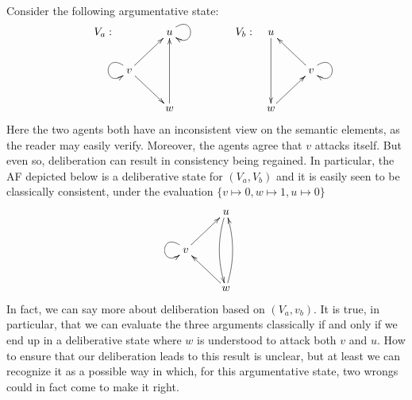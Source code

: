 \documentclass[greybox]{svmult}
\begin{document}
\begin{example}
\end{example}

\begin{example}\label{ex:wr}
Consider the following argumentative state:
$$
\begin{array}{llll}
V_a: & \xymatrix{ & u \ar@(ru,rd) \\ v \ar[ur] \ar[dr] \ar@(lu,ld) \\ & w \ar[uu] } & \hspace{1.5cm} V_b: & \xymatrix{ u \ar[dd] \\ & v \ar@(ru,rd) \ar[ul] \\ w \ar[ur] }
\end{array}
$$
Here the two agents both have an inconsistent view on the semantic elements, as the reader may easily verify. Moreover, the agents agree that $v$ attacks itself. But even so, deliberation can result in consistency being regained. In particular, the AF depicted below is a deliberative state for $(V_a,V_b)$ and it is easily seen to be classically consistent, under the evaluation $\{v \mapsto 0, w \mapsto 1, u \mapsto 0\}$
$$
\xymatrix{ & u \ar@/_/[dd] \\ v \ar@(lu,ld) \ar[ur] \\ & w \ar[ul] \ar@/_/[uu] }
$$
In fact, we can say more about deliberation based on $(V_a,v_b)$. It is true, in particular, that we can evaluate the three arguments classically if and only if we end up in a deliberative state where $w$ is understood to attack both $v$ and $u$. How to ensure that our deliberation leads to this result is unclear, but at least we can recognize it as a possible way in which, for this argumentative state, two wrongs could in fact come to make it right.


\end{example}
\end{document}
